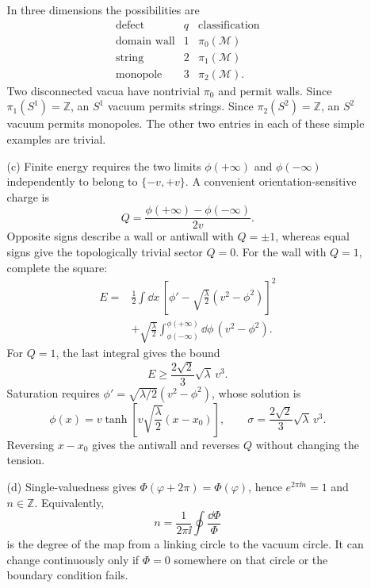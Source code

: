 \begin{enumerate}
\begin{enumerate}
    In three dimensions the possibilities are
    \[
    \begin{array}{c|c|c}
      \text{defect}&q&\text{classification}\\ \hline
      \text{domain wall}&1&\pi_0(\mathcal M)\\
      \text{string}&2&\pi_1(\mathcal M)\\
      \text{monopole}&3&\pi_2(\mathcal M).
    \end{array}
    \]
    Two disconnected vacua have nontrivial \(\pi_0\) and permit walls.
    Since \(\pi_1(S^1)=\mathbb Z\), an \(S^1\) vacuum permits strings.
    Since \(\pi_2(S^2)=\mathbb Z\), an \(S^2\) vacuum permits monopoles.
    The other two entries in each of these simple examples are trivial.
    \item[(c)]
    Finite energy requires the two limits
    \(\phi(+\infty)\) and \(\phi(-\infty)\) independently to belong to
    \(\{-v,+v\}\).  A convenient orientation-sensitive charge is
    \[
      Q=\frac{\phi(+\infty)-\phi(-\infty)}{2v}.
    \]
    Opposite signs describe a wall or antiwall with \(Q=\pm1\), whereas
    equal signs give the topologically trivial sector \(Q=0\).  For the
    wall with \(Q=1\), complete the square:
    \[
    \begin{split}
      E={}&\frac12\int \dd x\,
        \left[\phi'
         -\sqrt{\frac\lambda2}(v^2-\phi^2)\right]^2\\
        &+\sqrt{\frac\lambda2}
         \int_{\phi(-\infty)}^{\phi(+\infty)}
          \dd\phi\,(v^2-\phi^2).
    \end{split}
    \]
    For \(Q=1\), the last integral gives the bound
    \[
      E\ge \frac{2\sqrt2}{3}\sqrt\lambda\,v^3.
    \]
    Saturation requires
    \(\phi'=\sqrt{\lambda/2}(v^2-\phi^2)\), whose solution is
    \[
      \boxed{\phi(x)=v\tanh\left[
        v\sqrt{\frac\lambda2}(x-x_0)\right],\qquad
        \sigma=\frac{2\sqrt2}{3}\sqrt\lambda\,v^3.}
    \]
    Reversing \(x-x_0\) gives the antiwall and reverses \(Q\) without
    changing the tension.
    \item[(d)]
    Single-valuedness gives
    \(\Phi(\varphi+2\pi)=\Phi(\varphi)\), hence
    \(e^{2\pi \ii n}=1\) and \(n\in\mathbb Z\).  Equivalently,
    \[
      n=\frac1{2\pi \ii}\oint\frac{\dd\Phi}{\Phi}
    \]
    is the degree of the map from a linking circle to the vacuum circle.
    It can change continuously only if \(\Phi=0\) somewhere on that
    circle or the boundary condition fails.


\end{enumerate}
\end{enumerate}
